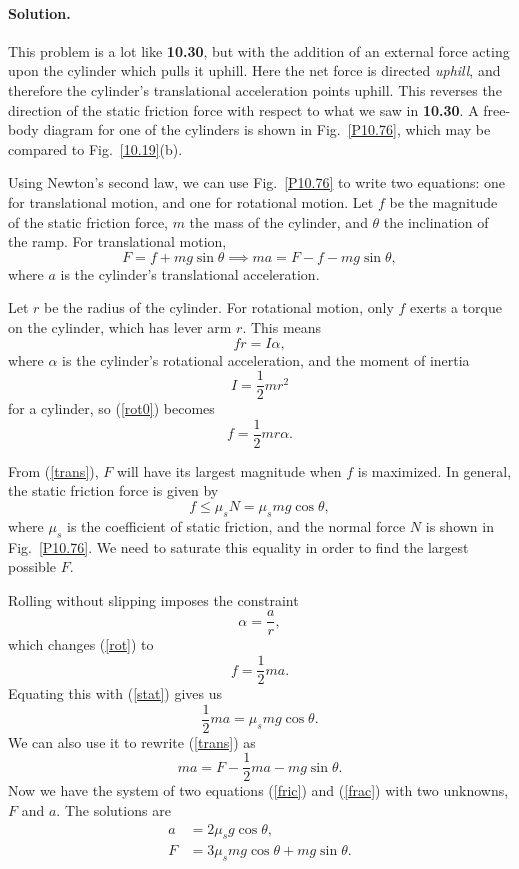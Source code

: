 \documentclass[11pt]{article}
\newcommand{\refeq}[1]{(\ref{#1})}
\newcommand{\beq}{\begin{equation*}}
\newcommand{\eeq}{\end{equation*}}
\newcommand{\beqn}{\begin{equation}}
\newcommand{\eeqn}{\end{equation}}
\newenvironment{solution}
{
    \paragraph{Solution.}
    \ignorespaces
}
{
    \bigskip
}
\begin{document}
\begin{solution}
	This problem is a lot like \textbf{10.30}, but with the addition of an external force acting upon the cylinder which pulls it uphill.  Here the net force is directed \emph{uphill}, and therefore the cylinder's translational acceleration points uphill.  This reverses the direction of the static friction force with respect to what we saw in \textbf{10.30}.  A free-body diagram for one of the cylinders is shown in Fig.~\ref{P10.76}, which may be compared to Fig.~\ref{10.19}(b).
	
	Using Newton's second law, we can use Fig.~\ref{P10.76} to write two equations: one for translational motion, and one for rotational motion.  Let $f$ be the magnitude of the static friction force, $m$ the mass of the cylinder, and $\theta$ the inclination of the ramp.  For translational motion,
	\beqn \label{trans}
		F = f + m g \sin{\theta} \implies ma = F - f - m g \sin{\theta},
	\eeqn
	where $a$ is the cylinder's translational acceleration.
	
	Let $r$ be the radius of the cylinder.  For rotational motion, only $f$ exerts a torque on the cylinder, which has lever arm $r$.  This means
	\beqn \label{rot0}
		f r = I \alpha,
	\eeqn
	where $\alpha$ is the cylinder's rotational acceleration, and the moment of inertia
	\beq
		I = \frac{1}{2} m r^2
	\eeq
	for a cylinder, so \refeq{rot0} becomes
	\beqn \label{rot}
		f = \frac{1}{2} m r \alpha.
	\eeqn
	
	From \refeq{trans}, $F$ will have its largest magnitude when $f$ is maximized.  In general, the static friction force is given by
			\beqn \label{stat}
				f \leq \mu_s N = \mu_s m g \cos \theta,
			\eeqn
			where $\mu_s$ is the coefficient of static friction, and the normal force $N$ is shown in Fig.~\ref{P10.76}.  We need to saturate this equality in order to find the largest possible $F$.
		
	Rolling without slipping imposes the constraint
	\beq
		\alpha = \frac{a}{r},
	\eeq
	which changes \refeq{rot} to
	\beq
		f = \frac{1}{2} m a.
	\eeq
	Equating this with \refeq{stat} gives us
	\beqn \label{fric}
		\frac{1}{2} m a = \mu_s m g \cos \theta.
	\eeqn
	We can also use it to rewrite \refeq{trans} as
	\beqn \label{frac}
			ma = F - \frac{1}{2} m a - m g \sin{\theta}.
	\eeqn
	Now we have the system of two equations \refeq{fric} and \refeq{frac} with two unknowns, $F$ and $a$.  The solutions are
	\begin{align}
		a &= 2 \mu_s g \cos{\theta}, \label{acyl} \\
		F &= 3 \mu_s m g \cos{\theta} + m g \sin{\theta}. \label{Fcyl}
	\end{align}
			

\end{solution}
\end{document}
